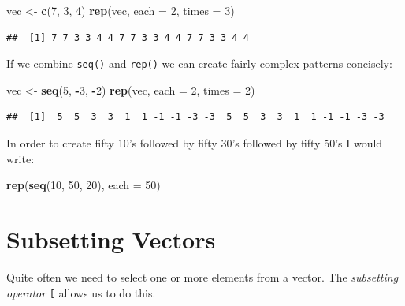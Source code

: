 \documentclass[]{book}
\makeatletter
\newenvironment{Shaded}{\begin{snugshade}}{\end{snugshade}}
\newcommand{\KeywordTok}[1]{\textcolor[rgb]{0.13,0.29,0.53}{\textbf{#1}}}
\newcommand{\DataTypeTok}[1]{\textcolor[rgb]{0.13,0.29,0.53}{#1}}
\newcommand{\DecValTok}[1]{\textcolor[rgb]{0.00,0.00,0.81}{#1}}
\newcommand{\StringTok}[1]{\textcolor[rgb]{0.31,0.60,0.02}{#1}}
\newcommand{\OperatorTok}[1]{\textcolor[rgb]{0.81,0.36,0.00}{\textbf{#1}}}
\newcommand{\NormalTok}[1]{#1}
\newenvironment{kframe}{%
\medskip{}
\setlength{\fboxsep}{.8em}
 \def\at@end@of@kframe{}%
 \ifinner\ifhmode%
  \def\at@end@of@kframe{\end{minipage}}%
  \begin{minipage}{\columnwidth}%
 \fi\fi%
 \def\FrameCommand##1{\hskip\@totalleftmargin \hskip-\fboxsep
 \colorbox{shadecolor}{##1}\hskip-\fboxsep
     \hskip-\linewidth \hskip-\@totalleftmargin \hskip\columnwidth}%
 \MakeFramed {\advance\hsize-\width
   \@totalleftmargin\z@ \linewidth\hsize
   \@setminipage}}%
 {\par\unskip\endMakeFramed%
 \at@end@of@kframe}
\renewenvironment{Shaded}{\begin{kframe}}{\end{kframe}}
\theoremstyle{definition}
\theoremstyle{definition}
\theoremstyle{definition}
\theoremstyle{remark}
\makeatother
\begin{document}
\begin{Shaded}
\begin{Highlighting}[]
\NormalTok{vec <-}\StringTok{ }\KeywordTok{c}\NormalTok{(}\DecValTok{7}\NormalTok{, }\DecValTok{3}\NormalTok{, }\DecValTok{4}\NormalTok{)}
\KeywordTok{rep}\NormalTok{(vec, }\DataTypeTok{each =} \DecValTok{2}\NormalTok{, }\DataTypeTok{times =} \DecValTok{3}\NormalTok{)}
\end{Highlighting}
\end{Shaded}

\begin{verbatim}
##  [1] 7 7 3 3 4 4 7 7 3 3 4 4 7 7 3 3 4 4
\end{verbatim}

If we combine \texttt{seq()} and \texttt{rep()} we can create fairly
complex patterns concisely:

\begin{Shaded}
\begin{Highlighting}[]
\NormalTok{vec <-}\StringTok{ }\KeywordTok{seq}\NormalTok{(}\DecValTok{5}\NormalTok{, }\OperatorTok{-}\DecValTok{3}\NormalTok{, }\OperatorTok{-}\DecValTok{2}\NormalTok{)}
\KeywordTok{rep}\NormalTok{(vec, }\DataTypeTok{each =} \DecValTok{2}\NormalTok{, }\DataTypeTok{times =} \DecValTok{2}\NormalTok{)}
\end{Highlighting}
\end{Shaded}

\begin{verbatim}
##  [1]  5  5  3  3  1  1 -1 -1 -3 -3  5  5  3  3  1  1 -1 -1 -3 -3
\end{verbatim}

In order to create fifty 10's followed by fifty 30's followed by fifty
50's I would write:

\begin{Shaded}
\begin{Highlighting}[]
\KeywordTok{rep}\NormalTok{(}\KeywordTok{seq}\NormalTok{(}\DecValTok{10}\NormalTok{, }\DecValTok{50}\NormalTok{, }\DecValTok{20}\NormalTok{), }\DataTypeTok{each =} \DecValTok{50}\NormalTok{)}
\end{Highlighting}
\end{Shaded}

\section{Subsetting Vectors}\label{subsetting-vectors}

Quite often we need to select one or more elements from a vector. The
\emph{subsetting operator} \texttt{{[}}
\index{R-operators![ (subsetting)} allows us to do this.
\end{document}
